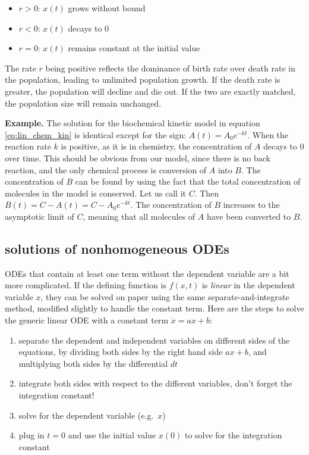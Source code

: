 \documentclass[
  letterpaper,
  DIV=11,
  numbers=noendperiod]{scrreprt}
\providecommand{\tightlist}{%
  \setlength{\itemsep}{0pt}\setlength{\parskip}{0pt}}\usepackage{longtable,booktabs,array}
\begin{document}
\begin{itemize}
\tightlist
\item
  \(r > 0\): \(x(t)\) grows without bound
\item
  \(r < 0\): \(x(t)\) decays to 0
\item
  \(r = 0\): \(x(t)\) remains constant at the initial value
\end{itemize}

The rate \(r\) being positive reflects the dominance of birth rate over
death rate in the population, leading to unlimited population growth. If
the death rate is greater, the population will decline and die out. If
the two are exactly matched, the population size will remain unchanged.

\textbf{Example.} The solution for the biochemical kinetic model in
equation \ref{eq:lin_chem_kin} is identical except for the sign:
\(A(t) = A_0 e^{-kt}\). When the reaction rate \(k\) is positive, as it
is in chemistry, the concentration of \(A\) decays to 0 over time. This
should be obvious from our model, since there is no back reaction, and
the only chemical process is conversion of \(A\) into \(B\). The
concentration of \(B\) can be found by using the fact that the total
concentration of molecules in the model is conserved. Let us call it
\(C\). Then \(B(t) = C - A(t) = C- A_0e^{-kt}\). The concentration of
\(B\) increases to the asymptotic limit of \(C\), meaning that all
molecules of \(A\) have been converted to \(B\).

\hypertarget{solutions-of-nonhomogeneous-odes}{%
\subsection{solutions of nonhomogeneous
ODEs}\label{solutions-of-nonhomogeneous-odes}}

ODEs that contain at least one term without the dependent variable are a
bit more complicated. If the defining function is \(f(x,t)\) is
\emph{linear} in the dependent variable \(x\), they can be solved on
paper using the same separate-and-integrate method, modified slightly to
handle the constant term. Here are the steps to solve the generic linear
ODE with a constant term \(\dot x = ax +b\):

\begin{enumerate}
\def\labelenumi{\arabic{enumi}.}
\tightlist
\item
  separate the dependent and independent variables on different sides of
  the equations, by dividing both sides by the right hand side \(ax+b\),
  and multiplying both sides by the differential \(dt\)
\item
  integrate both sides with respect to the different variables, don't
  forget the integration constant!
\item
  solve for the dependent variable (e.g.~\(x\))
\item
  plug in \(t=0\) and use the initial value \(x(0)\) to solve for the
  integration constant
\end{enumerate}
\end{document}
